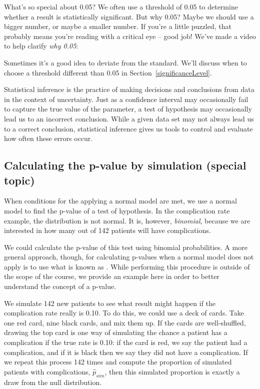 \begin{onebox}{What's so special about 0.05?}
We often use a threshold of 0.05 to determine whether a result is statistically significant. But why 0.05? Maybe we should use a bigger number, or maybe a smaller number. If you're a little puzzled, that probably means you're reading with a critical eye -- good job! We've made a video to help clarify \emph{why 0.05}:
\begin{center}
\end{center}
Sometimes it's a good idea to deviate from the standard. We'll discuss when to choose a threshold different than 0.05 in Section~\ref{significanceLevel}.\vspace{0.5mm}\end{onebox}

Statistical inference is the practice of making decisions and conclusions from data in the context of uncertainty. Just as a confidence interval may occasionally fail to capture the true value of the parameter, a test of hypothesis may occasionally lead us to an incorrect conclusion. While a given data set may not always lead us to a correct conclusion, statistical inference gives us tools to control and evaluate how often these errors occur.


\subsection{Calculating the p-value by simulation (special topic)}
\label{calcPValueUsingSimulationSubSection}

When conditions for the applying a normal model are met, we use a normal model to find the p-value of a test of hypothesis. In the complication rate example, the distribution is not normal. It is, however, \emph{binomial}, because we are interested in how many out of 142 patients will have complications.

We could calculate the p-value of this test using binomial probabilities. A more general approach, though, for calculating p-values when a normal model does not apply is to use what is known as . While performing this procedure is outside of the scope of the course, we provide an example here in order to better understand the concept of a p-value.

We simulate 142 new patients to see what result might happen if the complication rate really is 0.10. To do this, we could use a deck of cards. Take one red card, nine black cards, and mix them up. If the cards are well-shuffled, drawing the top card is one way of simulating the chance a patient has a complication if the true rate is 0.10: if the card is red, we say the patient had a complication, and if it is black then we say they did not have a complication. If we repeat this process 142 times and compute the proportion of simulated patients with complications, $\hat{p}_{sim}$, then this simulated proportion is exactly a draw from the null distribution.

